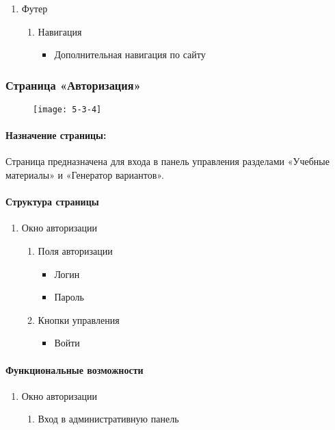 \begin{enumerate}
	\item Футер
	\begin{enumerate}
		\item Навигация
		\begin{itemize}
			\item Дополнительная навигация по сайту
		\end{itemize}
	\end{enumerate}
\end{enumerate}


\subsubsection{Страница «Авторизация»}
\begin{figure}[H]
	\texttt{[image: 5-3-4]}
\end{figure}
\paragraph{Назначение страницы:} Страница предназначена для входа в панель управления разделами «Учебные материалы» и «Генератор вариантов».

\paragraph{Структура страницы}
\begin{enumerate}
	\item Окно авторизации
	\begin{enumerate}
		\item Поля авторизации
		\begin{itemize}
		\item Логин
		\item Пароль
		\end{itemize}
		\item Кнопки управления
		\begin{itemize}
		\item Войти
		\end{itemize}
	\end{enumerate}
\end{enumerate}

\paragraph{Функциональные возможности}
\begin{enumerate}
	\item Окно авторизации
	\begin{enumerate}
		\item Вход в административную панель
	\end{enumerate}
\end{enumerate}


